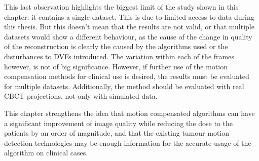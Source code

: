 This last observation highlights the biggest limit of the study shown in this chapter: it contains a single dataset. This is due to limited access to data during this thesis. But this doesn't mean that the results are not valid, or that multiple datasets would show a different behaviour, as the cause of the change in quality of the reconstruction is clearly the caused by the algorithms used or the disturbances to DVFs introduced. The variation within each of the frames however, is not of big significance. However, if further use of the motion compensation methods for clinical use is desired, the results must be evaluated for multiple datasets. Additionally, the method should be evaluated with real CBCT projections, not only with simulated data.

This chapter strengthens the idea that motion compensated algorithms can have a significant improvement of image quality while reducing the dose to the patients by an order of magnitude, and that the existing tumour motion detection technologies may be enough information for the accurate usage of the algorithm on clinical cases. 




